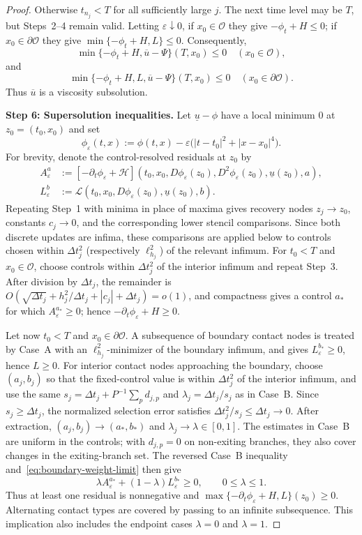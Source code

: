 \documentclass[11pt]{article}
\theoremstyle{definition}
\theoremstyle{remark}
\newcommand{\cO}{\mathcal{O}}
\newcommand{\dt}{\Delta t}
\begin{document}
\begin{proof}
		Otherwise $t_{n_j}<T$ for all sufficiently large $j$.  The next time level
		may be $T$, but Steps~2--4 remain valid.  Letting $\varepsilon\downarrow0$,
		if $x_0\in\cO$ they give
		$-\phi_t+H\le0$; if $x_0\in\partial\cO$ they give
		$\min\{-\phi_t+H,L\}\le0$.  Consequently,
		\[
		\min\{-\phi_t+H,\overline u-\Psi\}(T,x_0)\le0
		\quad(x_0\in\cO),
		\]
		and
		\[
		\min\{-\phi_t+H,L,\overline u-\Psi\}(T,x_0)\le0
		\quad(x_0\in\partial\cO).
		\]
		Thus $\overline u$ is a viscosity subsolution.
		
		\medskip
		\noindent\textbf{Step 6: Supersolution inequalities.}
		Let $\underline u-\phi$ have a local minimum $0$ at
		$z_0=(t_0,x_0)$ and set
		\[
		\phi_\varepsilon(t,x)
		:=\phi(t,x)-\varepsilon\bigl(|t-t_0|^2+|x-x_0|^4\bigr).
		\]
		For brevity, denote the control-resolved residuals at $z_0$ by
		\begin{align*}
			A_\varepsilon^a
			&:=[-\partial_t\phi_\varepsilon+\mathcal H]
			(t_0,x_0,D\phi_\varepsilon(z_0),D^2\phi_\varepsilon(z_0),
			\underline u(z_0),a),\\
			L_\varepsilon^b
			&:=\mathcal L(t_0,x_0,D\phi_\varepsilon(z_0),
			\underline u(z_0),b).
		\end{align*}
		Repeating Step~1 with minima in place of maxima gives recovery nodes
		$z_j\to z_0$, constants $c_j\to0$, and the corresponding lower stencil
		comparisons.  Since both discrete updates are infima, these comparisons are
		applied below to controls chosen within $\dt_j^2$ (respectively
		$\ell_{h_j}^2$) of the relevant infimum.
		For $t_0<T$ and $x_0\in\cO$, choose controls within $\dt_j^2$ of the
		interior infimum and repeat Step~3.  After division by $\dt_j$, the remainder
		is $O(\sqrt{\dt_j}+h_j^2/\dt_j+|c_j|+\dt_j)=o(1)$, and compactness gives a
		control $a_*$ for which $A_\varepsilon^{a_*}\ge0$; hence
		$-\partial_t\phi_\varepsilon+H\ge0$.
		
		Let now $t_0<T$ and $x_0\in\partial\cO$.  A subsequence of boundary
		contact nodes is treated by Case~A with an $\ell_{h_j}^2$-minimizer of the
		boundary infimum, and gives $L_\varepsilon^{b_*}\ge0$, hence $L\ge0$.
		For interior contact nodes approaching the boundary, choose $(a_j,b_j)$
		so that the fixed-control value is within $\dt_j^2$ of the interior
		infimum, and use the same
		$s_j=\dt_j+P^{-1}\sum_p d_{j,p}$ and $\lambda_j=\dt_j/s_j$ as in Case~B.
		Since $s_j\ge\dt_j$, the normalized selection error satisfies
		$\dt_j^2/s_j\le\dt_j\to0$.  After extraction,
		$(a_j,b_j)\to(a_*,b_*)$ and $\lambda_j\to\lambda\in[0,1]$.
		The estimates in Case~B are uniform in the controls; with $d_{j,p}=0$ on
		non-exiting branches, they also cover changes in the exiting-branch set.
		The reversed Case~B inequality and~\eqref{eq:boundary-weight-limit} then give
		\[
		\lambda A_\varepsilon^{a_*}+(1-\lambda)L_\varepsilon^{b_*}\ge0,
		\qquad 0\le\lambda\le1.
		\]
		Thus at least one residual is nonnegative and
		$\max\{-\partial_t\phi_\varepsilon+H,L\}(z_0)\ge0$.  Alternating contact
		types are covered by passing to an infinite subsequence.  This implication
		also includes the endpoint cases $\lambda=0$ and $\lambda=1$.
		

\end{proof}
\end{document}
